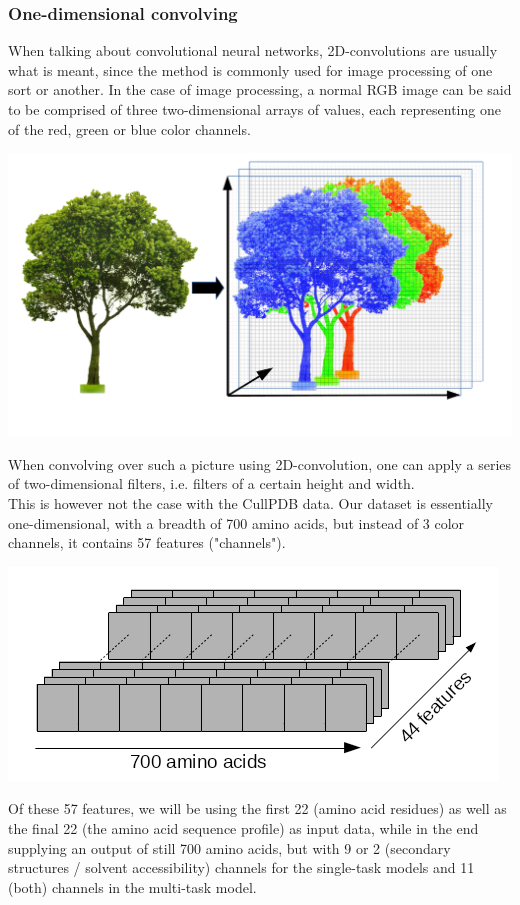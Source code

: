 \begin{multicols}{2}
\subsubsection{One-dimensional convolving}
When talking about convolutional neural networks, 2D-convolutions are usually what is meant, since the method is commonly used for image processing of one sort or another. In the case of image processing, a normal RGB image can be said to be comprised of three two-dimensional arrays of values, each representing one of the red, green or blue color channels.
\begin{Figure}
 \centering
 \includegraphics[width=\linewidth]{../graphs/tree/full}
 \captionsetup{width=0.8\linewidth, font=small}
\end{Figure}
\noindent When convolving over such a picture using 2D-convolution, one can apply a series of two-dimensional filters, i.e. filters of a certain height and width.\\
This is however not the case with the CullPDB data. Our dataset is essentially one-dimensional, with a breadth of 700 amino acids, but instead of 3 color channels, it contains 57 features ("channels").
\begin{Figure}
 \centering
 \includegraphics[width=\linewidth]{../graphs/tree/amino}
 \captionsetup{width=0.8\linewidth, font=small}
\end{Figure}
\noindent Of these 57 features, we will be using the first 22 (amino acid residues) as well as the final 22 (the amino acid sequence profile) as input data, while in the end supplying an output of still 700 amino acids, but with 9 or 2 (secondary structures / solvent accessibility) channels for the single-task models and 11 (both) channels in the multi-task model.



\end{multicols}
